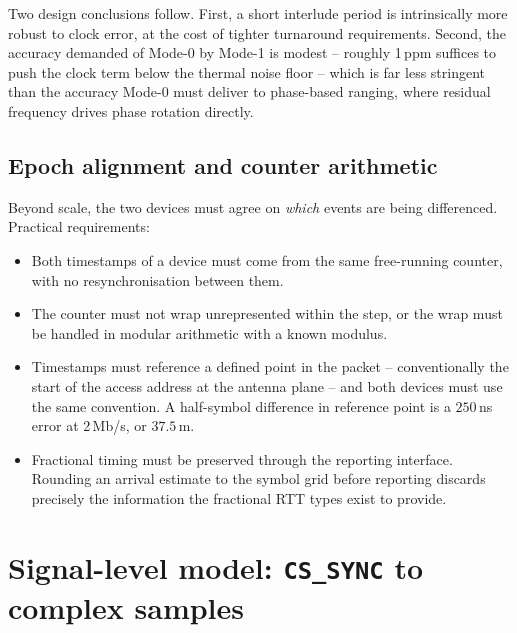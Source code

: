 \documentclass[11pt,a4paper]{article}
\newcommand{\code}[1]{\texttt{\small #1}}
\begin{document}
Two design conclusions follow. First, a short interlude period is intrinsically more robust to
clock error, at the cost of tighter turnaround requirements. Second, the accuracy demanded of
Mode-0 by Mode-1 is modest -- roughly 1\,ppm suffices to push the clock term below the thermal
noise floor -- which is far less stringent than the accuracy Mode-0 must deliver to phase-based
ranging, where residual frequency drives phase rotation directly.

\subsection{Epoch alignment and counter arithmetic}

Beyond scale, the two devices must agree on \emph{which} events are being differenced. Practical
requirements:

\begin{itemize}[leftmargin=1.4em,itemsep=1pt]
  \item Both timestamps of a device must come from the same free-running counter, with no
    resynchronisation between them.
  \item The counter must not wrap unrepresented within the step, or the wrap must be handled in
    modular arithmetic with a known modulus.
  \item Timestamps must reference a defined point in the packet -- conventionally the start of the
    access address at the antenna plane -- and both devices must use the same convention. A
    half-symbol difference in reference point is a $250$\,ns error at 2\,Mb/s, or $37.5$\,m.
  \item Fractional timing must be preserved through the reporting interface. Rounding an arrival
    estimate to the symbol grid before reporting discards precisely the information the fractional
    RTT types exist to provide.
\end{itemize}


\section{Signal-level model: \code{CS\_SYNC} to complex samples}
\end{document}
